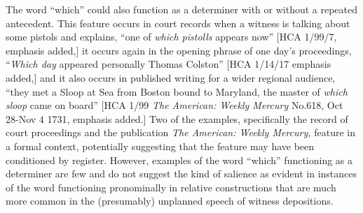 The word “which” could also function as a  determiner with or without a repeated  antecedent. This feature occurs in court records when a witness is talking about some pistols and explains, “one of \textit{which pistolls} appears now” [HCA 1/99/7, emphasis added,] it occurs again in the opening phrase of one day’s proceedings, “\textit{Which day} appeared personally Thomas Colston” [HCA 1/14/17 emphasis added,] and it also occurs in published writing for a wider regional audience, “they met a Sloop at Sea from Boston bound to Maryland, the master of \textit{which sloop} came on board” [HCA 1/99 \textit{The American: Weekly Mercury} No.618, Oct 28-Nov 4 1731, emphasis added.] Two of the examples, specifically the record of court proceedings and the publication \textit{The American: Weekly Mercury,} feature in a formal context, potentially suggesting that the feature may have been conditioned by register. However, examples of the word “which” functioning as a determiner are few and do not suggest the kind of salience as evident in instances of the word functioning pronominally in relative constructions that are much more common in the (presumably) unplanned speech of witness depositions. 

